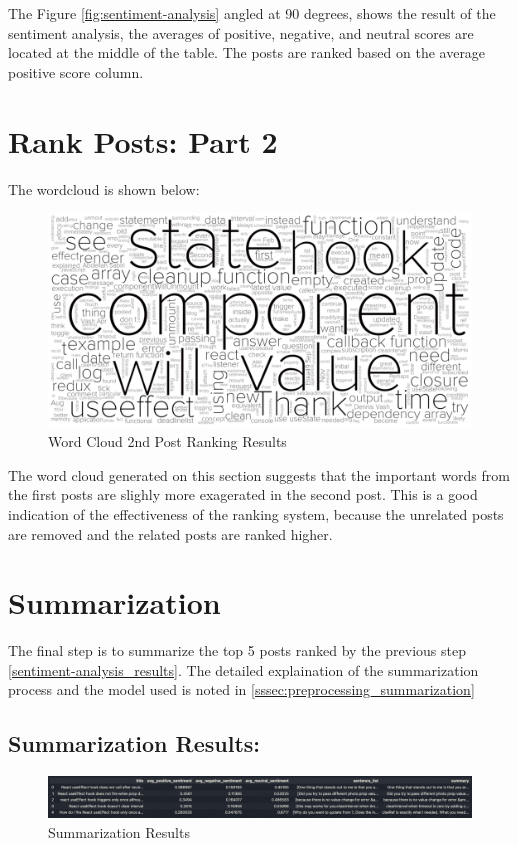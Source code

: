 The Figure \ref{fig:sentiment-analysis} angled at 90 degrees, shows the result of the sentiment analysis, the averages of positive, negative, and neutral scores are located at the middle of the table. The posts are ranked based on the average positive score column.

\section{Rank Posts: Part 2} \label{rank-posts_2_results}
The wordcloud is shown below:

\begin{figure}[H]
  \centering
  \includegraphics[scale=0.35]{assets/rank_post_2.png}
  \caption{Word Cloud 2nd Post Ranking  Results}
  \label{fig:rank_post_2_wc}
\end{figure}

\noindent The word cloud generated on this section suggests that the important words from the first posts are slighly more exagerated in the second post. This is a good indication of the effectiveness of the ranking system, because the unrelated posts are removed and the related posts are ranked higher.

\section{Summarization} \label{summarization_results}
The final step is to summarize the top 5 posts ranked by the previous step \ref{sentiment-analysis_results}. The detailed explaination of the summarization process and the model used is noted in \ref{sssec:preprocessing_summarization}

\subsection{Summarization Results:} \label{summarization_results}
\begin{figure}[H]
  \centering
  \includegraphics[scale=0.40, angle=90]{assets/summarization.png}
  \caption{Summarization Results}
  \label{fig:summarization}
\end{figure}

